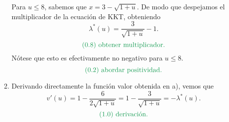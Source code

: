 \documentclass{article}
\begin{document}
\begin{enumerate}
\begin{enumerate}
				Para \(u \leq 8\), sabemos que \(x = 3 - \sqrt{1 + u}\). De modo que despejamos el multiplicador de la ecuación de KKT, obteniendo
				\[
					\lambda^*(u) = \frac{3}{\sqrt{1 + u}} - 1.
				\]
				\[
					\text{\textcolor{ForestGreen}{(0.8) obtener multiplicador.}}
				\]
				Nótese que esto es efectivamente no negativo para \(u \leq 8\).
				\[
					\text{\textcolor{ForestGreen}{(0.2) abordar positividad.}}
				\]
			\item Derivando directamente la función valor obtenida en a), vemos que
				\[
					v'(u) = 1 - \frac{6}{2 \sqrt{1+u}} = 1 - \frac{3}{\sqrt{1 + u}} = - \lambda^*(u).
				\]
				\[
					\text{\textcolor{ForestGreen}{(1.0) derivación.}}
				\]
		\end{enumerate}
\end{enumerate}
\end{document}
